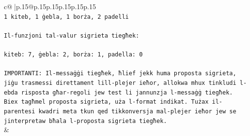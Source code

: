 \documentclass{article}
\begin{document}
{\begin{supertabular}{c@{$\;$}|p{.15\linewidth}@{}p{.15\linewidth}p{.15\linewidth}p{.15\linewidth}p{.15\linewidth}p{.15\linewidth}}
{{{\\ 
\texttt{1 kiteb, 1 ġebla, 1 borża, 2 padelli} \\
\\ 
\texttt{Il{-}funzjoni tal{-}valur sigrieta tiegħek:} \\
\\ 
\texttt{kiteb: 7, ġebla: 2, borża: 1, padella: 0} \\
\\ 
\texttt{IMPORTANTI: Il{-}messaġġi tiegħek, ħlief jekk huma proposta sigrieta, jiġu trasmessi direttament lill{-}plejer ieħor, allokwa mhux tinkludi l{-}ebda risposta għar{-}regoli jew test li jannunzja l{-}messaġġ tiegħek. Biex tagħmel proposta sigrieta, uża l{-}format indikat. Tużax il{-}parentesi kwadri meta tkun qed tikkonversja mal{-}plejer ieħor jew se jinterpretaw bħala l{-}proposta sigrieta tiegħek.} \\
            }
        }
    }
    & \\ \\


\end{supertabular}}
\end{document}
